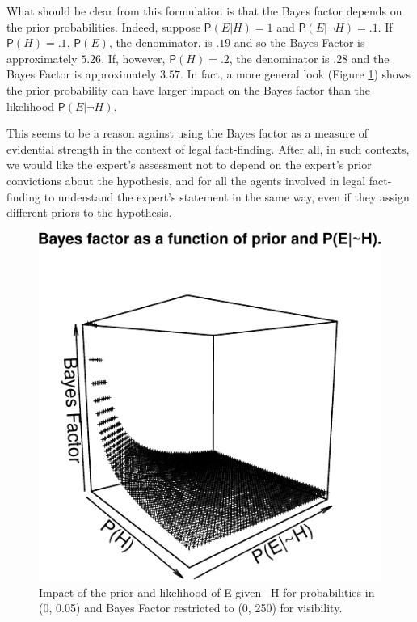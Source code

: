 \documentclass[10pt,dvipsnames,enabledeprecatedfontcommands]{scrartcl}
\newcommand{\n}{\neg}
\newcommand{\pr}[1]{\mathsf{P}(#1)}
\begin{document}
\noindent What should be clear from this formulation is that the Bayes
factor depends on the prior probabilities. Indeed, suppose
\(\pr{E \vert H} = 1\) and \(\pr{E \vert \neg H} = .1\). If
\(\pr{H}=.1\), \(\pr{E}\), the denominator, is \(.19\) and so the Bayes
Factor is approximately \(5.26\). If, however, \(\pr{H} =.2\), the
denominator is \(.28\) and the Bayes Factor is approximately \(3.57\).
In fact, a more general look (Figure \ref{fig:BayesFactorPrior}) shows
the prior probability can have larger impact on the Bayes factor than
the likelihood \(\pr{E \vert \n H}\).

This seems to be a reason against using the Bayes factor as a measure of
evidential strength in the context of legal fact-finding. After all, in
such contexts, we would like the expert's assessment not to depend on
the expert's prior convictions about the hypothesis, and for all the
agents involved in legal fact-finding to understand the expert's
statement in the same way, even if they assign different priors to the
hypothesis.

\footnotesize

\normalsize 

\begin{figure}


\begin{center}\includegraphics[width=1\linewidth]{lr-chapter3_files/figure-latex/fig-BayesFactorPrior-1} \end{center}
\caption{Impact of the prior and likelihood of E given ~H for probabilities in (0, 0.05) and Bayes Factor restricted to (0, 250) for visibility.}
\label{fig:BayesFactorPrior}
\end{figure}
\end{document}
